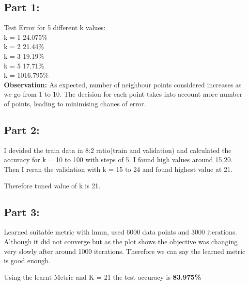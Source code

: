 \documentclass[a4paper,11pt]{article}
\newcommand\tab[1][0.6cm]{\hspace*{#1}}
\begin{document}
\begin{mlsolution}
\subsection*{Part 1:}
Test Error for 5 different k values:\\
\tab k = 1 \tab \tab 24.075\%\\
\tab k = 2 \tab \tab 21.44\%\\
\tab k = 3 \tab \tab 19.19\%\\
\tab k = 5 \tab \tab 17.71\%\\
\tab k = 10\tab \tab 16.795\%\\

\textbf{Observation:}
 As expected, number of neighbour points considered increases as we go from 1 to 10. The decision for each point takes into account more number of points, leading to minimising chanes of error.

\subsection*{Part 2:}
  I devided the train data in 8:2 ratio(train and validation) and calculated the accuracy for k = 10 to 100 with steps of 5. I found high values around 15,20. Then I reran the validation with k = 15 to 24 and found highest value at 21.

Therefore tuned value of k is 21.

\subsection*{Part 3:}
Learned suitable metric with lmnn, used 6000 data points and 3000 iterations. Although it did not converge but as the plot shows the objective was changing very slowly after around 1000 iterations. Therefore we can say the learned metric is good enough.

Using the learnt Metric and K = 21 the test accuracy is \textbf{83.975\%}

\end{mlsolution}	
\end{document}
